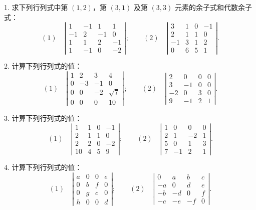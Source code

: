 \documentclass[UTF8,12pt,a4paper,fontset=fandol]{ctexart}
\begin{document}
1. 求下列行列式中第 $(1,2)$，第 $(3,1)$ 及第 $(3,3)$ 元素的余子式和代数余子式：
\[
(1)\quad
\left|\begin{array}{rrrr}
1 & -1 & 1 & 1\\
-1 & 2 & -1 & 0\\
1 & 1 & 2 & -1\\
1 & -1 & 0 & -2
\end{array}\right|;\qquad
(2)\quad
\left|\begin{array}{rrrr}
3 & 1 & 0 & -1\\
2 & 1 & 1 & 0\\
-1 & 3 & 1 & 2\\
0 & 6 & 5 & 1
\end{array}\right|.
\]

2. 计算下列行列式的值：
\[
(1)\quad
\left|\begin{array}{rrrr}
1 & 2 & 3 & 4\\
0 & -3 & -1 & 0\\
0 & 0 & -2 & \sqrt{7}\\
0 & 0 & 0 & 10
\end{array}\right|;\qquad
(2)\quad
\left|\begin{array}{rrrr}
2 & 0 & 0 & 0\\
3 & -1 & 0 & 0\\
-2 & 0 & 3 & 0\\
9 & -1 & 2 & 1
\end{array}\right|.
\]

3. 计算下列行列式的值：
\[
(1)\quad
\left|\begin{array}{rrrr}
1 & 1 & 0 & -1\\
2 & 1 & 1 & 0\\
2 & 2 & 0 & -2\\
10 & 4 & 5 & 9
\end{array}\right|;\qquad
(2)\quad
\left|\begin{array}{rrrr}
1 & 0 & 0 & 0\\
2 & 1 & -2 & 1\\
5 & 0 & 1 & 3\\
7 & -1 & 2 & 1
\end{array}\right|.
\]

4. 计算下列行列式的值：
\[
(1)\quad
\left|\begin{array}{cccc}
a & 0 & 0 & e\\
0 & b & f & 0\\
0 & g & c & 0\\
h & 0 & 0 & d
\end{array}\right|;\qquad
(2)\quad
\left|\begin{array}{rrrr}
0 & a & b & c\\
-a & 0 & d & e\\
-b & -d & 0 & f\\
-c & -e & -f & 0
\end{array}\right|.
\]
\end{document}
